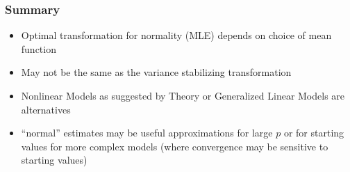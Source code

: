 \documentclass[handout]{beamer}
\begin{document}
\begin{frame}\frametitle{Summary}
  \begin{itemize}
  \item Optimal transformation for normality (MLE) depends on choice
    of mean function \pause
 \item May not be the same as the variance stabilizing transformation \pause
 \item Nonlinear Models as suggested by Theory or Generalized Linear
   Models are alternatives \pause
 \item ``normal'' estimates may be useful approximations for large $p$
   or for starting values for more complex models  (where convergence
   may be sensitive to starting values)
  \end{itemize}
\end{frame}
\end{document}
